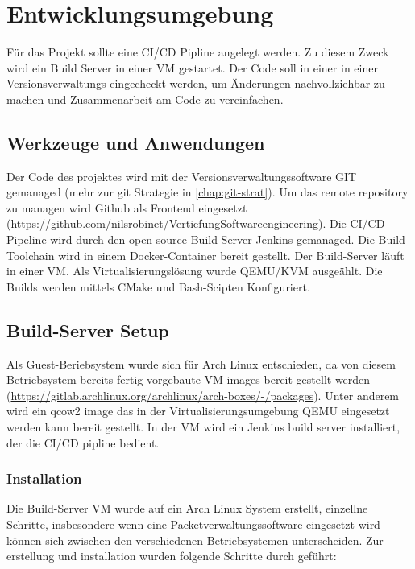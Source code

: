 \chapter{Entwicklungsumgebung}

Für das Projekt sollte eine \acf{CI/CD} Pipline angelegt werden. Zu diesem Zweck wird ein Build Server in einer \acf{VM} gestartet. Der Code soll in einer in einer Versionsverwaltungs eingecheckt werden, um Änderungen nachvollziehbar zu machen und Zusammenarbeit am Code zu vereinfachen.  

\section{Werkzeuge und Anwendungen}

Der Code des projektes wird mit der Versionsverwaltungssoftware GIT gemanaged (mehr zur git Strategie in \autoref{chap:git-strat}). Um das remote repository zu managen wird Github als Frontend eingesetzt (\url{https://github.com/nilsrobinet/VertiefungSoftwareengineering}). Die \ac{CI/CD} Pipeline wird durch den open source Build-Server Jenkins gemanaged. Die Build-Toolchain wird in einem Docker-Container bereit gestellt. Der Build-Server läuft in einer \ac{VM}. Als Virtualisierungslösung wurde QEMU/KVM ausgeählt. Die Builds werden mittels CMake und Bash-Scipten Konfiguriert.

\section{Build-Server Setup}

Als Guest-Beriebsystem wurde sich für Arch Linux entschieden, da von diesem Betriebsystem bereits fertig vorgebaute \ac{VM} images bereit gestellt werden (\url{https://gitlab.archlinux.org/archlinux/arch-boxes/-/packages}). Unter anderem wird ein qcow2 image das in der Virtualisierungsumgebung QEMU eingesetzt werden kann bereit gestellt.
In der \ac{VM} wird ein Jenkins build server installiert, der die CI/CD pipline bedient.

\subsection{Installation}

Die Build-Server \ac{VM} wurde auf ein Arch Linux System erstellt, einzellne Schritte, insbesondere wenn eine Packetverwaltungssoftware eingesetzt wird können sich zwischen den verschiedenen Betriebsystemen unterscheiden.
Zur erstellung und installation wurden folgende Schritte durch geführt:

